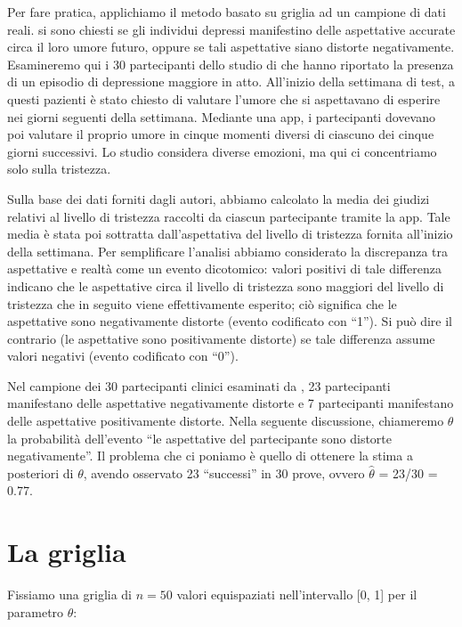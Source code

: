 \documentclass[
]{memoir}
\begin{document}
Per fare pratica, applichiamo il metodo basato su griglia ad un campione di dati reali. \citet{zetschefuture2019} si sono chiesti se gli individui depressi manifestino delle aspettative accurate circa il loro umore futuro, oppure se tali aspettative siano distorte negativamente. Esamineremo qui i 30 partecipanti dello studio di \citet{zetschefuture2019} che hanno riportato la presenza di un episodio di depressione maggiore in atto. All'inizio della settimana di test, a questi pazienti è stato chiesto di valutare l'umore che si aspettavano di esperire nei giorni seguenti della settimana. Mediante una app, i partecipanti dovevano poi valutare il proprio umore in cinque momenti diversi di ciascuno dei cinque giorni successivi. Lo studio considera diverse emozioni, ma qui ci concentriamo solo sulla tristezza.

Sulla base dei dati forniti dagli autori, abbiamo calcolato la media dei giudizi relativi al livello di tristezza raccolti da ciascun partecipante tramite la app. Tale media è stata poi sottratta dall'aspettativa del livello di tristezza fornita all'inizio della settimana. Per semplificare l'analisi abbiamo considerato la discrepanza tra aspettative e realtà come un evento dicotomico: valori positivi di tale differenza indicano che le aspettative circa il livello di tristezza sono maggiori del livello di tristezza che in seguito viene effettivamente esperito; ciò significa che le aspettative sono negativamente distorte (evento codificato con ``1''). Si può dire il contrario (le aspettative sono positivamente distorte) se tale differenza assume valori negativi (evento codificato con ``0'').

Nel campione dei 30 partecipanti clinici esaminati da \citet{zetschefuture2019}, 23 partecipanti manifestano delle aspettative negativamente distorte e 7 partecipanti manifestano delle aspettative positivamente distorte. Nella seguente discussione, chiameremo \(\theta\) la probabilità dell'evento ``le aspettative del partecipante sono distorte negativamente''. Il problema che ci poniamo è quello di ottenere la stima a posteriori di \(\theta\), avendo osservato 23 ``successi'' in 30 prove, ovvero \(\hat{\theta}\) = 23/30 = 0.77.

\hypertarget{la-griglia}{%
\section{La griglia}\label{la-griglia}}

Fissiamo una griglia di \(n = 50\) valori equispaziati nell'intervallo {[}0, 1{]} per il parametro \(\theta\):
\end{document}
